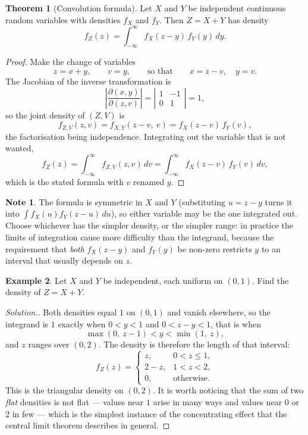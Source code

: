 \documentclass[11pt,a4paper]{article}
\theoremstyle{definition}
\newtheorem{thm}{Theorem}[subsection]
\newtheorem{exa}[thm]{Example}
\newtheorem*{note}{Note}
\newenvironment{solution}
  {\renewcommand{\qedsymbol}{}\begin{proof}[\textit{Solution}.]}
  {\end{proof}}
\begin{document}
\begin{thm}[Convolution formula]
Let $X$ and $Y$ be independent continuous random variables with densities $f_X$
and $f_Y$. Then $Z = X+Y$ has density
$$f_Z(z) = \int_{-\infty}^{\infty} f_X(z-y)\,f_Y(y)\,dy .$$
\end{thm}

\begin{proof}
Make the change of variables
$$z = x+y,\qquad v = y,\qquad\text{so that}\qquad x = z-v,\quad y = v .$$
The Jacobian of the inverse transformation is
$$\left|\frac{\partial(x,y)}{\partial(z,v)}\right|
= \left|\begin{matrix} 1 & -1\\ 0 & 1\end{matrix}\right| = 1 ,$$
so the joint density of $(Z,V)$ is
$$f_{Z,V}(z,v) = f_{X,Y}(z-v,\ v) = f_X(z-v)\,f_Y(v),$$
the factorisation being independence. Integrating out the variable that is not
wanted,
$$f_Z(z) = \int_{-\infty}^{\infty} f_{Z,V}(z,v)\,dv
= \int_{-\infty}^{\infty} f_X(z-v)\,f_Y(v)\,dv,$$
which is the stated formula with $v$ renamed $y$.
\end{proof}

\begin{note}
The formula is symmetric in $X$ and $Y$ (substituting $u=z-y$ turns it into
$\int f_X(u)f_Y(z-u)\,du$), so either variable may be the one integrated out.
Choose whichever has the simpler density, or the simpler range: in practice the
limits of integration cause more difficulty than the integrand, because the
requirement that \emph{both} $f_X(z-y)$ and $f_Y(y)$ be non-zero restricts $y$
to an interval that usually depends on $z$.
\end{note}

\begin{exa}
Let $X$ and $Y$ be independent, each uniform on $(0,1)$. Find the density of
$Z=X+Y$.
\end{exa}

\begin{solution}
Both densities equal $1$ on $(0,1)$ and vanish elsewhere, so the integrand is
$1$ exactly when $0<y<1$ and $0<z-y<1$, that is when
$$\max(0,\ z-1) < y < \min(1,\ z),$$
and $z$ ranges over $(0,2)$. The density is therefore the length of that
interval:
$$f_Z(z) = \begin{cases}
z, & 0<z\leq 1,\\
2-z, & 1<z<2,\\
0, & \text{otherwise.}
\end{cases}$$
This is the triangular density on $(0,2)$. It is worth noticing that the sum of
two \emph{flat} densities is not flat --- values near $1$ arise in many ways and
values near $0$ or $2$ in few --- which is the simplest instance of the
concentrating effect that the central limit theorem describes in general.
\end{solution}
\end{document}
